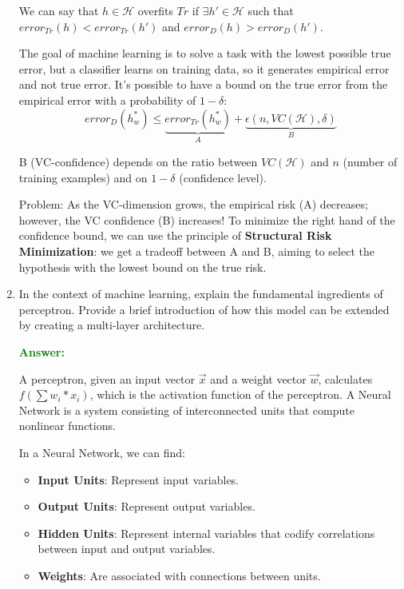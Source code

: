 \documentclass[12pt]{article}
\begin{document}
\begin{enumerate}[label=\textbf{ML.\arabic*}]
          We can say that $h\in\mathcal{H}$ overfits $Tr$ if $\exists h'\in\mathcal{H}$ such that $error_{Tr}(h)<error_{Tr}(h')$ and $error_D(h)>error_D(h')$.

          The goal of machine learning is to solve a task with the lowest possible true error, but a classifier learns on training data, so it generates empirical error and not true error. It's possible to have a bound on the true error from the empirical error with a probability of $1-\delta$:
          \begin{equation}\label{eq:confidence_interval}
              error_D(h^*_w) \leq \underbrace{error_{Tr}(h^*_w)}_A + \underbrace{\epsilon(n,VC(\mathcal{H}),\delta)}_B
          \end{equation}

          B (VC-confidence) depends on the ratio between $VC(\mathcal{H})$ and $n$ (number of training examples) and on $1- \delta$ (confidence level).

          Problem: As the VC-dimension grows, the empirical risk (A) decreases; however, the VC confidence (B) increases! To minimize the right hand of the confidence bound, we can use the principle of \textbf{Structural Risk Minimization}: we get a tradeoff between A and B, aiming to select the hypothesis with the lowest bound on the true risk.

    \item In the context of machine learning, explain the fundamental ingredients of perceptron.
          Provide a brief introduction of how this model can be extended by creating a multi-layer architecture.

          \textcolor{green}{\textbf{Answer:}}

          A perceptron, given an input vector $\vec{x}$ and a weight vector $\vec{w}$, calculates $f(\sum{w_i*x_i})$, which is the activation function of the perceptron. A Neural Network is a system consisting of interconnected units that compute nonlinear functions.

          In a Neural Network, we can find:
          \begin{itemize}
              \item \textbf{Input Units}: Represent input variables.
              \item \textbf{Output Units}: Represent output variables.
              \item \textbf{Hidden Units}: Represent internal variables that codify correlations between input and output variables.
              \item \textbf{Weights}: Are associated with connections between units.
          \end{itemize}


\end{enumerate}
\end{document}
